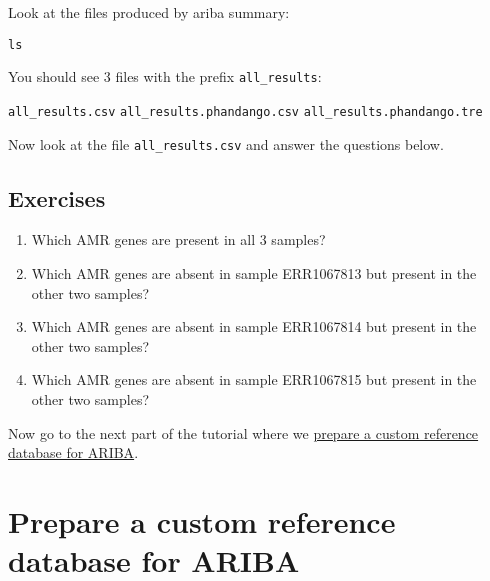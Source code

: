 \documentclass[11pt]{article}
\makeatletter
\providecommand{\tightlist}{%
      \setlength{\itemsep}{0pt}\setlength{\parskip}{0pt}}
\newcommand{\boxspacing}{\kern\kvtcb@left@rule\kern\kvtcb@boxsep}
\newcommand{\prompt}[4]{
        {\ttfamily\llap{{\color{blue}\LARGE\faKeyboardO\hspace{3pt}#4}}\vspace{-\baselineskip}}
    }
\makeatother
\begin{document}
    Look at the files produced by ariba summary:

    \begin{tcolorbox}[breakable, size=fbox, boxrule=1pt, pad at break*=1mm,colback=cellbackground, colframe=cellborder]
\prompt{In}{incolor}{ }{\boxspacing}
\begin{Verbatim}[commandchars=\\\{\}]
ls
\end{Verbatim}
\end{tcolorbox}

    You should see 3 files with the prefix \texttt{all\_results}:

\texttt{all\_results.csv} \texttt{all\_results.phandango.csv}
\texttt{all\_results.phandango.tre}

Now look at the file \texttt{all\_results.csv} and answer the questions
below.

    \hypertarget{exercises}{%
\subsection{Exercises}\label{exercises}}

\begin{enumerate}
\def\labelenumi{\arabic{enumi}.}
\tightlist
\item
  Which AMR genes are present in all 3 samples?
\item
  Which AMR genes are absent in sample ERR1067813 but present in the
  other two samples?
\item
  Which AMR genes are absent in sample ERR1067814 but present in the
  other two samples?
\item
  Which AMR genes are absent in sample ERR1067815 but present in the
  other two samples?
\end{enumerate}

    Now go to the next part of the tutorial where we
\href{make_custom_db.ipynb}{prepare a custom reference database for
ARIBA}.





\newpage





    \hypertarget{prepare-a-custom-reference-database-for-ariba}{%
\section{Prepare a custom reference database for
ARIBA}\label{prepare-a-custom-reference-database-for-ariba}}
\end{document}
